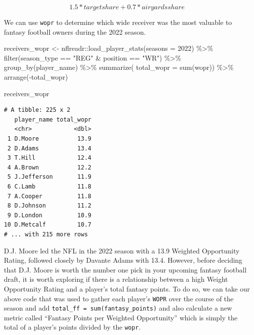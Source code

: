 \documentclass[
  letterpaper,
]{krantz}
\newenvironment{Shaded}{\begin{snugshade}}{\end{snugshade}}
\newcommand{\AttributeTok}[1]{\textcolor[rgb]{0.40,0.45,0.13}{#1}}
\newcommand{\DecValTok}[1]{\textcolor[rgb]{0.68,0.00,0.00}{#1}}
\newcommand{\FunctionTok}[1]{\textcolor[rgb]{0.28,0.35,0.67}{#1}}
\newcommand{\NormalTok}[1]{\textcolor[rgb]{0.00,0.23,0.31}{#1}}
\newcommand{\OtherTok}[1]{\textcolor[rgb]{0.00,0.23,0.31}{#1}}
\newcommand{\SpecialCharTok}[1]{\textcolor[rgb]{0.37,0.37,0.37}{#1}}
\newcommand{\StringTok}[1]{\textcolor[rgb]{0.13,0.47,0.30}{#1}}
\begin{document}
\[
1.5 * target share + 0.7 * air yards share
\]

We can use \texttt{wopr} to determine which wide receiver was the most
valuable to fantasy football owners during the 2022 season.

\begin{Shaded}
\begin{Highlighting}[]
\NormalTok{receivers\_wopr }\OtherTok{\textless{}{-}}\NormalTok{ nflreadr}\SpecialCharTok{::}\FunctionTok{load\_player\_stats}\NormalTok{(}\AttributeTok{seasons =} \DecValTok{2022}\NormalTok{) }\SpecialCharTok{\%\textgreater{}\%}
  \FunctionTok{filter}\NormalTok{(season\_type }\SpecialCharTok{==} \StringTok{"REG"} \SpecialCharTok{\&}\NormalTok{ position }\SpecialCharTok{==} \StringTok{"WR"}\NormalTok{) }\SpecialCharTok{\%\textgreater{}\%}
  \FunctionTok{group\_by}\NormalTok{(player\_name) }\SpecialCharTok{\%\textgreater{}\%}
  \FunctionTok{summarize}\NormalTok{(}
    \AttributeTok{total\_wopr =} \FunctionTok{sum}\NormalTok{(wopr)) }\SpecialCharTok{\%\textgreater{}\%}
  \FunctionTok{arrange}\NormalTok{(}\SpecialCharTok{{-}}\NormalTok{total\_wopr)}

\NormalTok{receivers\_wopr}
\end{Highlighting}
\end{Shaded}

\begin{verbatim}
# A tibble: 225 x 2
   player_name total_wopr
   <chr>            <dbl>
 1 D.Moore           13.9
 2 D.Adams           13.4
 3 T.Hill            12.4
 4 A.Brown           12.2
 5 J.Jefferson       11.9
 6 C.Lamb            11.8
 7 A.Cooper          11.8
 8 D.Johnson         11.2
 9 D.London          10.9
10 D.Metcalf         10.7
# ... with 215 more rows
\end{verbatim}

D.J. Moore led the NFL in the 2022 season with a 13.9 Weighted
Opportunity Rating, followed closely by Davante Adams with 13.4.
However, before deciding that D.J. Moore is worth the number one pick in
your upcoming fantasy football draft, it is worth exploring if there is
a relationship between a high Weight Opportunity Rating and a player's
total fantasy points. To do so, we can take our above code that was used
to gather each player's \texttt{WOPR} over the course of the season and
add \texttt{total\_ff\ =\ sum(fantasy\_points)} and also calculate a new
metric called ``Fantasy Points per Weighted Opportunity'' which is
simply the total of a player's points divided by the \texttt{wopr}.
\end{document}
